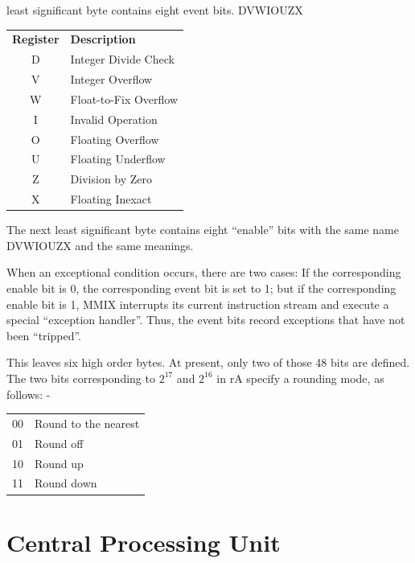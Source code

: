 \documentclass[a4paper,11pt]{report}
\newcommand{\head}[1]{\textbf{#1}}
\begin{document}
least significant byte contains eight event bits. DVWIOUZX

\begin{center}
\begin{tabular}{ c l }
\head{Register} & \head{Description}\\
D & Integer Divide Check\\
V & Integer Overflow\\
W & Float-to-Fix Overflow\\
I & Invalid Operation\\
O & Floating Overflow\\
U & Floating Underflow\\
Z & Division by Zero\\
X & Floating Inexact\\
\end{tabular}
\end{center}

The next least significant byte contains eight ``enable'' bits with the same name DVWIOUZX and the same meanings.  

When an exceptional condition occurs, there are two cases: If the corresponding enable bit is 0, the corresponding event bit is set to 1; but if the corresponding enable bit is 1, MMIX interrupts its current instruction stream and execute a special ``exception handler''.  Thus, the event bits record exceptions that have not been ``tripped''.

This leaves six high order bytes.  At present, only  two of those 48 bits are defined. The two bits corresponding to 
\begin{math}
2^{17}
\end{math}
and 
\begin{math}
2^{16}
\end{math}
in rA specify a rounding mode, as follows: -

\begin{center}
\begin{tabular}{ c l }
00 & Round to the nearest\\
01 & Round off\\
10 & Round up\\
11 & Round down\\
\end{tabular}
\end{center}

\section{Central Processing Unit}
\end{document}
